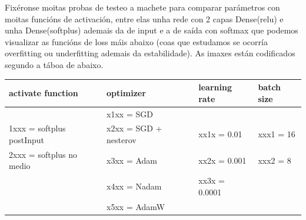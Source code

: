 \documentclass[12pt,a4paper,twoside]{article}
\begin{document}
Fixéronse moitas probas de testeo a machete para comparar parámetros con moitas funcións de activación, entre elas unha rede con 2 capas Dense(relu) e unha Dense(softplus)
ademais da de input e a de saída con softmax que podemos visualizar as funcións de loss máis abaixo (coas que estudamos se ocorría overfitting ou 
underfitting ademais da estabilidade). As imaxes están codificados segundo a táboa de abaixo.

\begin{table}[H]
    \centering
    \begin{tabular}{|l|l|l|l|}
        \hline
        activate function & optimizer & learning rate & batch size    \\ \hline
        ~ & x1xx = SGD & ~ &  ~  \\ \hline
        1xxx = softplus postInput & x2xx = SGD + nesterov & xx1x = 0.01 & xxx1 = 16    \\ \hline
        2xxx = softplus no medio & x3xx = Adam & xx2x = 0.001 & xxx2 = 8    \\ \hline
        ~ & x4xx = Nadam & xx3x = 0.0001 &     \\ \hline
        ~ & x5xx = AdamW & ~ &  ~   \\ \hline
    \end{tabular}
\end{table}
\end{document}
